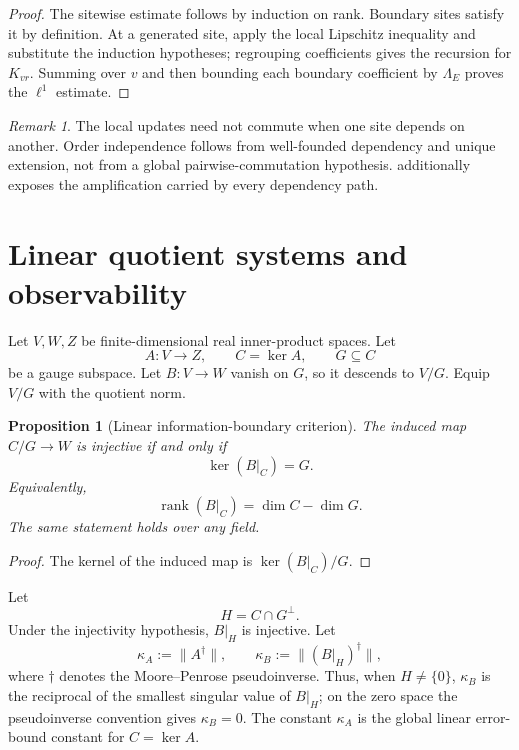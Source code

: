 \documentclass[11pt]{article}
\newtheorem{proposition}[theorem]{Proposition}
\theoremstyle{definition}
\theoremstyle{remark}
\newtheorem{remark}[theorem]{Remark}
\numberwithin{equation}{section}
\newcommand{\rank}{\operatorname{rank}}
\begin{document}
\begin{proof}
The sitewise estimate follows by induction on rank.  Boundary sites satisfy it by definition.  At a generated site, apply the local Lipschitz inequality and substitute the induction hypotheses; regrouping coefficients gives the recursion for $K_{vr}$.  Summing over $v$ and then bounding each boundary coefficient by $\Lambda_E$ proves the $\ell^1$ estimate.
\end{proof}

\begin{remark}
The local updates need not commute when one site depends on another.  Order independence follows from well-founded dependency and unique extension, not from a global pairwise-commutation hypothesis.   additionally exposes the amplification carried by every dependency path.
\end{remark}

\section{Linear quotient systems and observability}\label{sec:linear}

Let $V,W,Z$ be finite-dimensional real inner-product spaces.  Let
\[
 A:V\to Z,
 \qquad C=\ker A,
 \qquad G\subseteq C
\]
be a gauge subspace.  Let $B:V\to W$ vanish on $G$, so it descends to $V/G$.  Equip $V/G$ with the quotient norm.

\begin{proposition}[Linear information-boundary criterion]\label{prop:linear-criterion}
The induced map $C/G\to W$ is injective if and only if
\[
 \ker(B|_C)=G.
\]
Equivalently,
\[
 \rank(B|_C)=\dim C-\dim G.
\]
The same statement holds over any field.
\end{proposition}

\begin{proof}
The kernel of the induced map is $\ker(B|_C)/G$.
\end{proof}

Let
\[
 H=C\cap G^\perp.
\]
Under the injectivity hypothesis, $B|_H$ is injective.  Let
\[
 \kappa_A:=\|A^\dagger\|,
 \qquad
 \kappa_B:=\|(B|_H)^\dagger\|,
\]
where $\dagger$ denotes the Moore--Penrose pseudoinverse.  Thus, when
$H\ne\{0\}$, $\kappa_B$ is the reciprocal of the smallest singular value
of $B|_H$; on the zero space the pseudoinverse convention gives
$\kappa_B=0$.  The constant $\kappa_A$ is the global linear error-bound
constant for $C=\ker A$.
\end{document}
